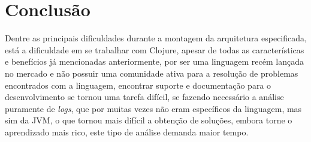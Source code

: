 \chapter{Conclusão}
\label{chap:conclusao}

Dentre as principais dificuldades durante a montagem da arquitetura especificada, está a dificuldade em se trabalhar com Clojure, apesar de todas as características e benefícios já mencionadas anteriormente, por ser uma linguagem recém lançada no mercado e não possuir uma comunidade ativa para a resolução de problemas encontrados com a linguagem, encontrar suporte e documentação para o desenvolvimento se tornou uma tarefa difícil, se fazendo necessário a análise puramente de \textit{logs}, que por muitas vezes não eram específicos da linguagem, mas sim da JVM, o que tornou mais difícil a obtenção de soluções, embora torne o aprendizado mais rico, este tipo de análise demanda maior tempo.